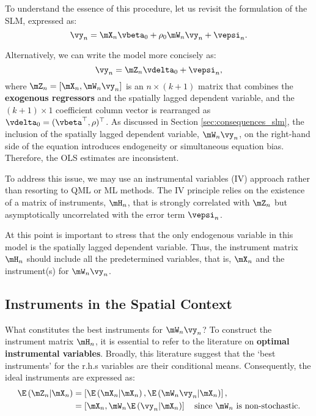 To understand the essence of this procedure, let us revisit the formulation of the SLM, expressed as:
\begin{equation*}
  \vy_n =   \mX_n\vbeta_0 + \rho_0\mW_n\vy_n + \vepsi_n.
\end{equation*}

Alternatively, we can write the model more concisely as:
\begin{equation*}
  \vy_n = \mZ_n \vdelta_0 + \vepsi_n,
\end{equation*}
%
where $\mZ_n = \left[\mX_n, \mW_n\vy_n\right]$ is an $n \times (k + 1)$ matrix that combines the \textbf{exogenous regressors} and the spatially lagged dependent variable, and the $(k + 1)\times 1$ coefficient column vector is rearranged as  $\vdelta_0 = (\vbeta^\top, \rho)^\top$. As discussed in Section \ref{sec:consequences_slm}, the inclusion of the spatially lagged dependent variable, $\mW_n\vy_n$, on the right-hand side of the equation introduces endogeneity or simultaneous equation bias. Therefore, the OLS estimates are inconsistent.

To address this issue, we may use an instrumental variables (IV) approach rather than resorting to QML or ML methods. The IV principle relies on the existence of a matrix of instruments, $\mH_n$, that is strongly correlated with $\mZ_n$ but asymptotically uncorrelated with the error term $\vepsi_n$.

At this point is important to stress that the only endogenous variable in this model is the spatially lagged dependent variable. Thus, the instrument  matrix $\mH_n$ should include all the predetermined variables, that is, $\mX_n$ and the instrument(s) for $\mW_n\vy_n$. 

\subsection{Instruments in the Spatial Context}

What constitutes the best instruments for $\mW_n\vy_n$? To construct the instrument matrix $\mH_n$, it is essential to refer to the literature on \textbf{optimal instrumental variables}. Broadly, this literature suggest that the `best instruments' for the r.h.s variables are their conditional means. Consequently, the ideal instruments are expressed as:
\begin{equation*}
  \begin{aligned}
\E\left(\mZ_n|\mX_n\right) & = \left[\E\left(\mX_n|\mX_n\right), \E\left(\mW_n\vy_n|\mX_n\right)\right], \\
                         & = \left[\mX_n, \mW_n \E\left(\vy_n|\mX_n\right)\right]\quad \mbox{since $\mW_n$ is non-stochastic}.
\end{aligned}
\end{equation*}

